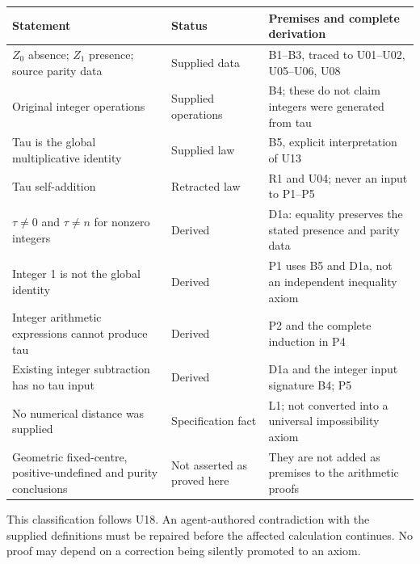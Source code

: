 {\def\LTcaptype{none} %
\begin{longtable}[]{@{}
  >{\raggedright\arraybackslash}p{}
  >{\raggedright\arraybackslash}p{}
  >{\raggedright\arraybackslash}p{}@{}}
\toprule\noalign{}
\begin{minipage}[b]{\linewidth}\raggedright
Statement
\end{minipage} & \begin{minipage}[b]{\linewidth}\raggedright
Status
\end{minipage} & \begin{minipage}[b]{\linewidth}\raggedright
Premises and complete derivation
\end{minipage} \\
\midrule\noalign{}
\endhead
\bottomrule\noalign{}
\endlastfoot
\(Z_0\) absence; \(Z_1\) presence; source parity data & Supplied data &
B1--B3, traced to U01--U02, U05--U06, U08 \\
Original integer operations & Supplied operations & B4; these do not
claim integers were generated from tau \\
Tau is the global multiplicative identity & Supplied law & B5, explicit
interpretation of U13 \\
Tau self-addition & Retracted law & R1 and U04; never an input to
P1--P5 \\
\(\tau\ne0\) and \(\tau\ne n\) for nonzero integers & Derived & D1a:
equality preserves the stated presence and parity data \\
Integer 1 is not the global identity & Derived & P1 uses B5 and D1a, not
an independent inequality axiom \\
Integer arithmetic expressions cannot produce tau & Derived & P2 and the
complete induction in P4 \\
Existing integer subtraction has no tau input & Derived & D1a and the
integer input signature B4; P5 \\
No numerical distance was supplied & Specification fact & L1; not
converted into a universal impossibility axiom \\
Geometric fixed-centre, positive-undefined and purity conclusions & Not
asserted as proved here & They are not added as premises to the
arithmetic proofs \\
\end{longtable}
}

This classification follows U18. An agent-authored contradiction with
the supplied definitions must be repaired before the affected
calculation continues. No proof may depend on a correction being
silently promoted to an axiom.

